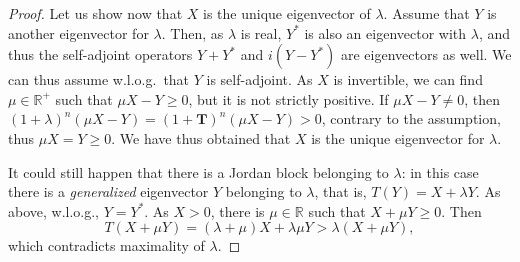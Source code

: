 \documentclass{article}
\begin{document}
\begin{proof}
  Let us show now that $X$ is the unique eigenvector of $\lambda$. Assume that $Y$ is another eigenvector for $\lambda$. Then, as $\lambda$ is real, $Y^*$ is also an eigenvector with $\lambda$, and thus the self-adjoint operators $Y+Y^*$ and $i(Y-Y^*)$ are eigenvectors as well. We can thus assume w.l.o.g.\ that $Y$ is self-adjoint. As $X$ is invertible, we can find $\mu\in \mathbb{R}^+$ such that $\mu X-Y \geq 0$, but it is not strictly positive. If $\mu X-Y\neq 0$, then $(1+\lambda)^n(\mu X - Y) = (1+\mathbf{T})^n(\mu X - Y)> 0$, contrary to the assumption, thus $\mu X = Y \geq 0$. We have thus obtained that $X$ is the unique eigenvector for $\lambda$.

  It could still happen that there is a Jordan block belonging to $\lambda$: in this case there is a \emph{generalized} eigenvector $Y$ belonging to $\lambda$, that is, $T(Y) = X + \lambda Y$. As above, w.l.o.g., $Y=Y^*$. As $X>0$, there is $\mu\in\mathbb{R}$ such that $X+\mu Y\geq 0$. Then 
  \begin{equation*}
      T(X+\mu Y) = (\lambda + \mu )X + \lambda\mu Y > \lambda(X +\mu Y), 
  \end{equation*}
  which contradicts maximality of $\lambda$.
\end{proof}
\end{document}
